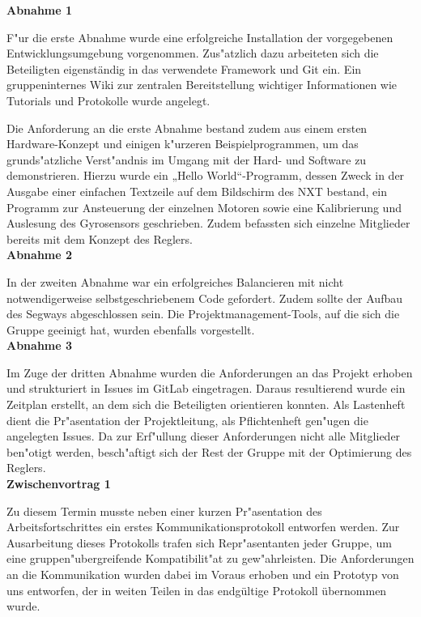 \documentclass[oneside,abstractoff,a4paper]{scrartcl}
\begin{document}
\noindent\textbf{Abnahme 1}

F"ur die erste Abnahme wurde eine erfolgreiche Installation der vorgegebenen Entwicklungsumgebung vorgenommen. Zus"atzlich dazu arbeiteten sich die Beteiligten eigenständig in das verwendete Framework und Git ein. Ein gruppeninternes Wiki zur zentralen Bereitstellung wichtiger Informationen wie Tutorials und Protokolle wurde angelegt.

Die Anforderung an die erste Abnahme bestand zudem aus einem ersten Hardware-Konzept und einigen k"urzeren Beispielprogrammen, um das grunds"atzliche Verst"andnis im Umgang mit der Hard- und Software zu demonstrieren. Hierzu wurde ein „Hello World“-Programm, dessen Zweck in der Ausgabe einer einfachen Textzeile auf dem Bildschirm des NXT bestand, ein Programm zur Ansteuerung der einzelnen Motoren sowie eine Kalibrierung und Auslesung des Gyrosensors geschrieben. Zudem befassten sich einzelne Mitglieder bereits mit dem Konzept des Reglers.\\

\noindent\textbf{Abnahme 2}

In der zweiten Abnahme war ein erfolgreiches Balancieren mit nicht notwendigerweise selbstgeschriebenem Code gefordert. Zudem sollte der Aufbau des Segways abgeschlossen sein. Die Projektmanagement-Tools, auf die sich die Gruppe geeinigt hat, wurden ebenfalls vorgestellt.\\

\noindent\textbf{Abnahme 3}

Im Zuge der dritten Abnahme wurden die Anforderungen an das Projekt erhoben und strukturiert in Issues im GitLab eingetragen. Daraus resultierend wurde ein Zeitplan erstellt, an dem sich die Beteiligten orientieren konnten. Als Lastenheft dient die Pr"asentation der Projektleitung, als Pflichtenheft gen"ugen die angelegten Issues. Da zur Erf"ullung dieser Anforderungen nicht alle Mitglieder ben"otigt werden, besch"aftigt sich der Rest der Gruppe mit der Optimierung des Reglers.\\

\noindent\textbf{Zwischenvortrag 1}
    
Zu diesem Termin musste neben einer kurzen Pr"asentation des Arbeitsfortschrittes ein erstes Kommunikationsprotokoll entworfen werden. Zur Ausarbeitung dieses Protokolls trafen sich Repr"asentanten jeder Gruppe, um eine gruppen"ubergreifende Kompatibilit"at zu gew"ahrleisten. Die Anforderungen an die Kommunikation wurden dabei im Voraus erhoben und ein Prototyp von uns entworfen, der in weiten Teilen in das endgültige Protokoll übernommen wurde. \\
\end{document}
